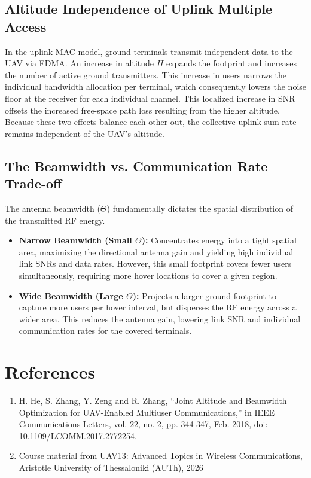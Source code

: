 \documentclass[11pt,a4paper]{article}
\begin{document}
    \subsection{Altitude Independence of Uplink Multiple Access}
    In the uplink MAC model, ground terminals transmit independent data to the UAV via FDMA. An increase in altitude $H$ expands the
    footprint and increases the number of active ground transmitters. This increase in users narrows the individual bandwidth allocation
    per terminal, which consequently lowers the noise floor at the receiver for each individual channel. This localized increase in SNR
    offsets the increased free-space path loss resulting from the higher altitude. Because these two effects balance each other out,
    the collective uplink sum rate remains independent of the UAV's altitude.

    \subsection{The Beamwidth vs. Communication Rate Trade-off}
    The antenna beamwidth ($\Theta$) fundamentally dictates the spatial distribution of the transmitted RF energy. 
    \begin{itemize}
        \item \textbf{Narrow Beamwidth (Small $\Theta$):} Concentrates energy into a tight spatial area, maximizing the directional antenna gain and
        yielding high individual link SNRs and data rates. However, this small footprint covers fewer users simultaneously, requiring more hover
        locations to cover a given region.
        \item \textbf{Wide Beamwidth (Large $\Theta$):} Projects a larger ground footprint to capture more users per hover interval, but disperses
        the RF energy across a wider area. This reduces the antenna gain, lowering link SNR and individual communication rates for the covered terminals.
    \end{itemize}

\newpage
\section{References}
    \begin{enumerate}
        \item H. He, S. Zhang, Y. Zeng and R. Zhang, “Joint Altitude and Beamwidth Optimization for UAV-Enabled Multiuser Communications,” in IEEE Communications Letters, vol. 22, no. 2, pp. 344-347, Feb. 2018, doi: 10.1109/LCOMM.2017.2772254.
        \item Course material from UAV13: Advanced Topics in Wireless Communications, Aristotle University of Thessaloniki (AUTh), 2026
    \end{enumerate}
\end{document}
